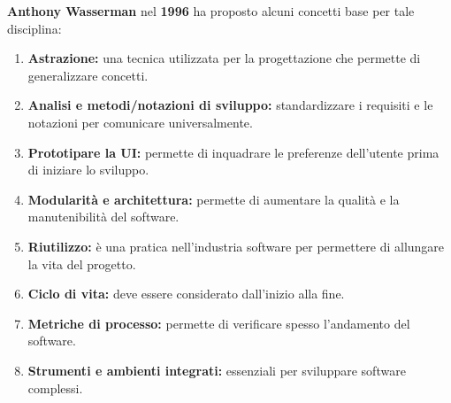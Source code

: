 \vspace*{0.02\textheight}
\textbf{Anthony Wasserman} nel \textbf{1996} ha proposto alcuni concetti base per tale disciplina:
\begin{enumerate}
    \item \textbf{Astrazione:} una tecnica utilizzata per la progettazione che permette di generalizzare concetti.
    \item \textbf{Analisi e metodi/notazioni di sviluppo:} standardizzare i requisiti e le notazioni per comunicare universalmente.
    \item \textbf{Prototipare la UI:} permette di inquadrare le preferenze dell'utente prima di iniziare lo sviluppo.
    \item \textbf{Modularità e architettura:} permette di aumentare la qualità e la manutenibilità del software.
    \item \textbf{Riutilizzo:} è una pratica nell'industria software per permettere di allungare la vita del progetto.
    \item \textbf{Ciclo di vita:} deve essere considerato dall'inizio alla fine.
    \item \textbf{Metriche di processo:} permette di verificare spesso l'andamento del software.
    \item \textbf{Strumenti e ambienti integrati:} essenziali per sviluppare software complessi.
\end{enumerate}

